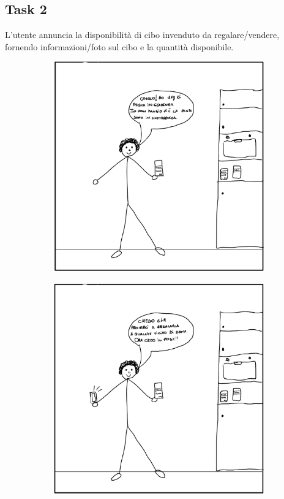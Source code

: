 \documentclass{article}
\begin{document}
\newpage
\subsection{Task 2}
L'utente annuncia la disponibilità di cibo invenduto da regalare/vendere, fornendo informazioni/foto sul cibo e la quantità disponibile.
\begin{figure}[H]
    \centering
    \begin{subfigure}{0.25\textwidth}
        \centering
        \includegraphics[width=\textwidth]{Storyboard/task2-img/t2.1.png}
    \end{subfigure}
    \hspace{0.02\textwidth}
    \begin{subfigure}{0.25\textwidth}
        \centering
        \includegraphics[width=\textwidth]{Storyboard/task2-img/t2.2.png}

\end{subfigure}
\end{figure}
\end{document}
